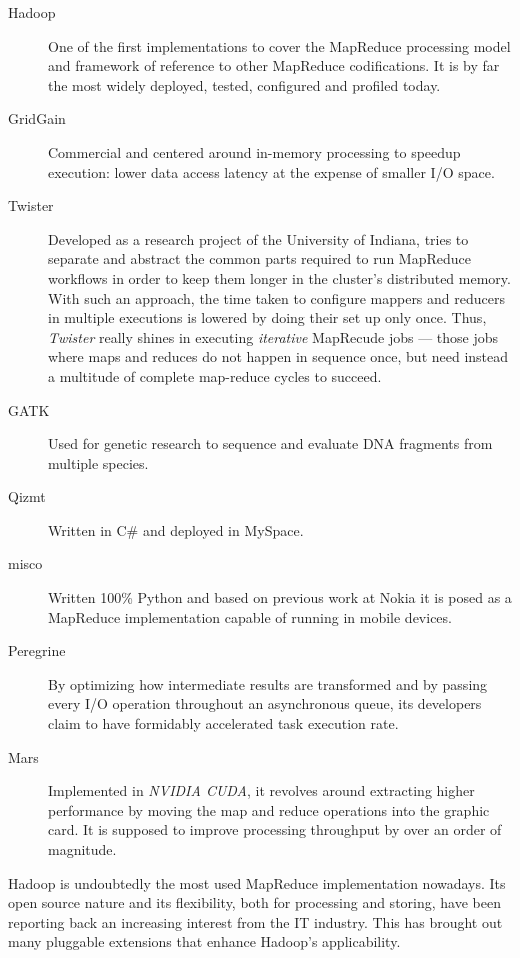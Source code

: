 \begin{description}
 \item[Hadoop] \cite{hadoopdefguide} One of the first implementations to cover the MapReduce processing model and framework of reference to other MapReduce codifications. It is by far the most widely deployed, tested, configured and profiled today.
 \item[GridGain] \cite{gridgainvshadoop} Commercial and centered around in-memory processing to speedup execution: lower data access latency at the expense of smaller I/O space.
 \item[Twister] \cite{twister} Developed as a research project of the University of Indiana, tries to separate and abstract the common parts required to run MapReduce workflows in order to keep them longer in the cluster's distributed memory. With such an approach, the time taken to configure mappers and reducers in multiple executions is lowered by doing their set up only once. Thus, \emph{Twister} really shines in executing \emph{iterative} MapRecude jobs --- those jobs where maps and reduces do not happen in sequence once, but need instead a multitude of complete map-reduce cycles to succeed.
 \item[GATK] \cite{gatk} Used for genetic research to sequence and evaluate DNA fragments from multiple species.
 \item[Qizmt] \cite{qizmt} Written in C\# and deployed in MySpace.
 \item[misco] \cite{misco} Written 100\% Python and based on previous work at Nokia it is posed as a MapReduce implementation capable of running in mobile devices.
 \item[Peregrine] \cite{peregrine} By optimizing how intermediate results are transformed and by passing every I/O operation throughout an asynchronous queue, its developers claim to have formidably accelerated task execution rate.
 \item[Mars] \cite{mars} Implemented in \emph{NVIDIA CUDA}, it revolves around extracting higher performance by moving the map and reduce operations into the graphic card. It is supposed to improve processing throughput by over an order of magnitude.
\end{description}

Hadoop is undoubtedly the most used MapReduce implementation nowadays. Its open source nature and its flexibility, both for processing and storing, have been reporting back an increasing interest from the IT industry. This has brought out many pluggable extensions that enhance Hadoop's applicability.
